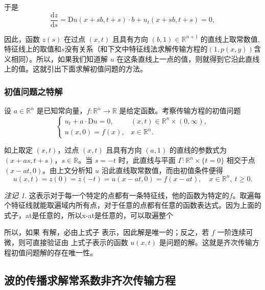 \documentclass[a4paper, 12pt, oneside]{article} %
\numberwithin{subsection}{section}
\numberwithin{subsubsection}{subsection}
\theoremstyle{plain}
\theoremstyle{definition}
\theoremstyle{remark}
\newtheorem{remark}[theorem]{注记}
\begin{document}
		于是
		\begin{equation}
			\frac{\mathrm{d}z}{\mathrm{d}s} = \mathrm{D}u(x + sb, t + s) \cdot b + u_t(x + sb, t + s) = 0,
		\end{equation}
		
		因此，函数 \(z(s)\) 在过点 \((x, t)\) 且具有方向 \((b, 1) \in \mathbb{R}^{n+1}\) 的直线上取常数值,特征线上的取值和$s$没有关系（和下文中特征线法求解传输方程的$(1, p(x, y))$含义相同）。所以，如果我们知道解 \(u\) 在这条直线上一点的值，则就得到它沿此直线上的值。这就引出下面求解初值问题的方法。
		
		\subsubsection{初值问题之特解} 
		设 $a \in \mathbb{R}^n$ 是已知常向量，$f: \mathbb{R}^n \rightarrow \mathbb{R}$ 是给定函数。考察传输方程的初值问题
		\begin{equation}
			\begin{cases}
				u_t + a \cdot \mathrm{D}u = 0, & (x, t) \in \mathbb{R}^n \times (0, \infty), \\
				u(x, 0) = f(x), & x \in \mathbb{R}^n.
			\end{cases}
		\end{equation}
		
		如上取定 $(x, t)$，过点 $(x, t)$ 且具有方向 $(a, 1)$ 的直线的参数式为 $(x + a s, t + s)$，$s \in \mathbb{R}$。当 $s = -t$ 时，此直线与平面 $\Gamma: \mathbb{R}^n \times \{t = 0\}$ 相交于点 $(x - a t, 0)$。由上文分析知 $u$ 沿此直线取常数值，而由初值条件便得
		\begin{equation}\label{eq:transport_homo_sol}
			u(x,t)=	z(0)=z(-t) =u(x - a t, 0) = f(x - a t), \quad x \in \mathbb{R}^n, \ t \geq 0.
		\end{equation}
		
		\begin{remark}
			这表示对于每一个特定的点都有一条特征线，他的函数为特定的$f$。取遍每个特征线就能取遍域内所有点，对于任意的点都有任意的函数表达式。因为上面的式子，at是任意的，所以x-at是任意的，可以取遍整个
		\end{remark}
		
		所以，如果 有解，必由上式子 表示，因此解是唯一的；反之，若 $f$ 一阶连续可微，则可直接验证由 上式子表示的函数 $u(x, t)$ 是问题的解。这就是齐次传输方程初值问题解的存在唯一性。
		
		\subsection{波的传播求解常系数非齐次传输方程} 
\end{document}
